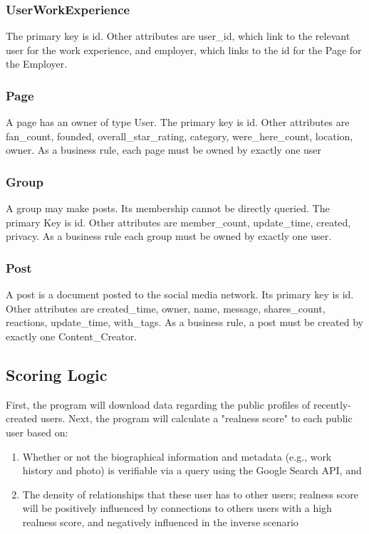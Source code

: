 \documentclass{article}
\begin{document}
\subsubsection{UserWorkExperience}

The primary key is id. Other attributes are user_id, which link to the relevant user for the work experience, and employer, which links to the id for the Page for the Employer.

\subsubsection{Page}
A page has an owner of type User. The primary key is id. Other attributes are fan_count, founded, overall_star_rating, category, were_here_count, location, owner.  As a business rule, each page must be owned by exactly one user

\subsubsection{Group}
A group may make posts. Its membership cannot be directly queried. The primary Key is id. Other attributes are member_count, update_time, created, privacy. As a business rule each group must be owned by exactly one user.

\subsubsection{Post}

A post is a document posted to the social media network. Its primary key is id. Other attributes are created_time, owner, name, message, shares_count, reactions, update_time, with_tags. As a business rule, a post must be created by exactly one Content_Creator.

\subsection*{Scoring Logic}

First, the program will download data regarding the public profiles of recently-created users.  Next, the program will calculate a "realness score" to each public user based on:

\begin{enumerate}
\item Whether or not the biographical information and metadata (e.g., work history and photo) is verifiable via a query using the Google Search API, and
\item The density of relationships that these user has to other users; realness score will be positively influenced by connections to others users with a high realness score, and negatively influenced in the inverse scenario
\end{enumerate}
\end{document}
